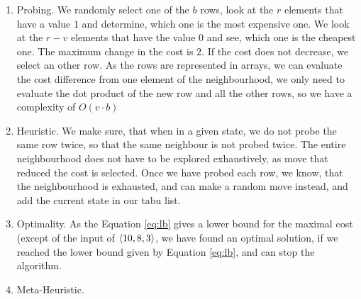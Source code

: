 \begin{enumerate}
\item Probing.  
We randomly select one of the $b$ rows, look at the $r$ elements that have a value $1$ and determine, which one is the most expensive one. We look at the $r-v$ elements that have the value $0$ and see, which one is the cheapest one. The maximum change in the \textsf{cost} is $2$. If the cost does not decrease, we select an other row. 
As the rows are represented in arrays, we can evaluate the cost difference from one element of the neighbourhood, we only need to evaluate the dot product of the new row and all the other rows, so we have a complexity of $O(v \cdot b)$
\item Heuristic. We make sure, that when in a given state, we do not probe the same row twice, so that the same neighbour is not probed twice. The entire neighbourhood does not have to be explored exhaustively, as move that reduced the cost is selected. Once we have probed each row, we know, that the neighbourhood is exhausted, and can make a random move instead, and add the current state in our tabu list. 
\item Optimality. As the Equation \ref{eq:lb} gives a lower bound for the maximal cost (except of the input of $\langle10, 8, 3\rangle$, we have found an optimal solution, if we reached the lower bound given by Equation \ref{eq:lb}, and can stop the algorithm. 
\item Meta-Heuristic. 

\end{enumerate}
